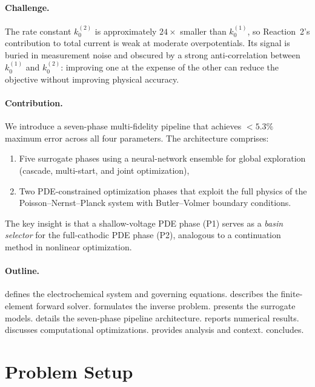 \documentclass[11pt,a4paper]{article}
\newcommand{\kzero}{k_0}
\begin{document}
\paragraph{Challenge.}
The rate constant $\kzero^{(2)}$ is approximately $24\times$ smaller than
$\kzero^{(1)}$, so Reaction~2's contribution to total current is weak at
moderate overpotentials. Its signal is buried in measurement noise and
obscured by a strong anti-correlation between $\kzero^{(1)}$ and
$\kzero^{(2)}$: improving one at the expense of the other can reduce the
objective without improving physical accuracy.

\paragraph{Contribution.}
We introduce a seven-phase multi-fidelity pipeline that achieves
$< 5.3\%$ maximum error across all four parameters. The architecture
comprises:
\begin{enumerate}
  \item Five surrogate phases using a neural-network ensemble for global
        exploration (cascade, multi-start, and joint optimization),
  \item Two PDE-constrained optimization phases that exploit the full
        physics of the Poisson--Nernst--Planck system with Butler--Volmer
        boundary conditions.
\end{enumerate}
The key insight is that a shallow-voltage PDE phase (P1) serves as a
\emph{basin selector} for the full-cathodic PDE phase (P2), analogous to
a continuation method in nonlinear optimization.

\paragraph{Outline.}
 defines the electrochemical system and governing equations.
 describes the finite-element forward solver.
 formulates the inverse problem.
 presents the surrogate models.
 details the seven-phase pipeline architecture.
 reports numerical results.
 discusses computational optimizations.
 provides analysis and context.
 concludes.

\section{Problem Setup}\label{sec:setup}
\end{document}
